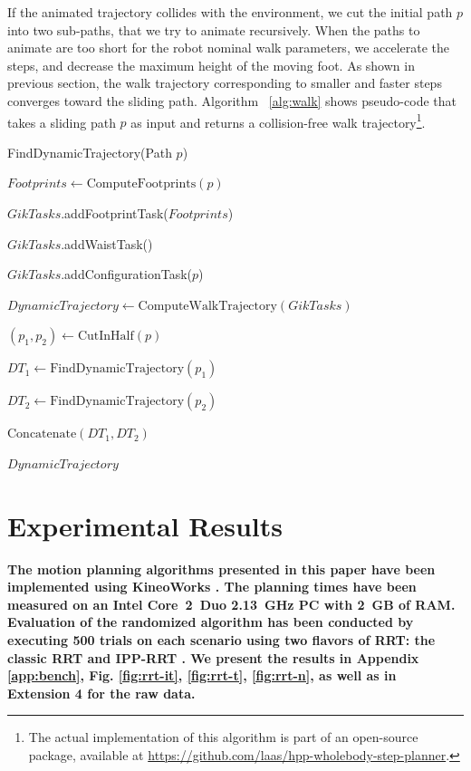 \documentclass{article}
\begin{document}
If the animated  trajectory collides with the environment,  we cut the
initial  path   $p$  into  two   sub-paths,  that  we  try   to  animate
recursively. When the  paths to animate are too  short for the robot
nominal  walk parameters, we  accelerate the  steps, and  decrease the
maximum height of  the moving foot. As shown  in previous section, the
walk trajectory  corresponding to  smaller and faster  steps converges
toward the  sliding path.  Algorithm ~\ref{alg:walk} shows pseudo-code
that takes  a sliding path $p$  as input and  returns a collision-free
walk trajectory\footnote{The actual implementation of this algorithm is
part of an open-source package, available at
\url{https://github.com/laas/hpp-wholebody-step-planner}.}.

\begin{algorithm}[h]
\caption{FindDynamicTrajectory(Path $p$)}
\label{alg:walk}
\begin{algorithmic}
\STATE $Footprints \leftarrow \text{ComputeFootprints}(p)$

\STATE $GikTasks$.addFootprintTask($Footprints$)

\STATE $GikTasks$.addWaistTask()

\STATE $GikTasks$.addConfigurationTask($p$)

\STATE $DynamicTrajectory \leftarrow
\text{ComputeWalkTrajectory}(GikTasks)$


\STATE $(p_1,p_2) \leftarrow \text{CutInHalf}(p)$

\STATE $DT_1 \leftarrow \text{FindDynamicTrajectory}(p_1)$

\STATE $DT_2 \leftarrow \text{FindDynamicTrajectory}(p_2)$

\RETURN $\text{Concatenate}(DT_1,DT_2)$

\ELSE

\RETURN $DynamicTrajectory$

\ENDIF
\end{algorithmic}
\end{algorithm}





\section{Experimental Results}

\label{sec:exp}

\textbf{The motion planning algorithms presented in this paper have
  been implemented using KineoWorks\texttrademark
  \cite{laumond2006kcs}. The planning times have been measured on an
  Intel Core~2~Duo 2.13~GHz PC with 2~GB of RAM. Evaluation of the
  randomized algorithm has been conducted by executing 500 trials on
  each scenario using two flavors of RRT: the classic RRT and IPP-RRT
  \cite{FERR04A}. We present the results in Appendix \ref{app:bench},
  Fig. \ref{fig:rrt-it}, \ref{fig:rrt-t}, \ref{fig:rrt-n}, as well as
  in Extension 4 for the raw data.}
\end{document}

